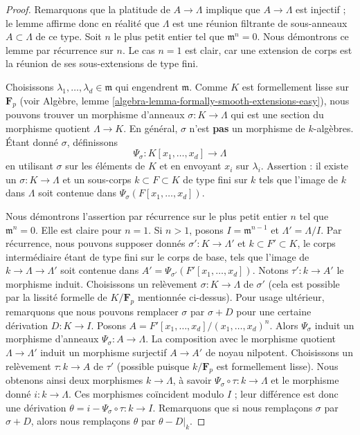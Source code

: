 \begin{proof}
Remarquons que la platitude de $A \to \Lambda$ implique que $A \to \Lambda$
est injectif ; le lemme affirme donc en réalité que $\Lambda$ est une
réunion filtrante de sous-anneaux $A \subset \Lambda$ de ce type.
Soit $n$ le plus petit entier tel que $\mathfrak m^n = 0$.
Nous démontrons ce lemme par récurrence sur $n$. Le cas $n = 1$ est clair,
car une extension de corps est la réunion de ses sous-extensions de type fini.

\medskip\noindent
Choisissons $\lambda_1, \ldots, \lambda_d \in \mathfrak m$ qui engendrent
$\mathfrak m$. Comme $K$ est formellement lisse sur $\mathbf{F}_p$ (voir
Algèbre, lemme \ref{algebra-lemma-formally-smooth-extensions-easy}), nous pouvons
trouver un morphisme d'anneaux $\sigma : K \to \Lambda$ qui est une section du
morphisme quotient $\Lambda \to K$. En général, $\sigma$ n'est {\bf pas}
un morphisme de $k$-algèbres. Étant donné $\sigma$, définissons
$$
\Psi_\sigma : K[x_1, \ldots, x_d] \longrightarrow \Lambda
$$
en utilisant $\sigma$ sur les éléments de $K$ et en envoyant $x_i$ sur $\lambda_i$.
Assertion : il existe un $\sigma : K \to \Lambda$
et un sous-corps $k \subset F \subset K$ de type fini sur $k$
tels que l'image de $k$ dans $\Lambda$ soit contenue dans
$\Psi_\sigma(F[x_1, \ldots, x_d])$.

\medskip\noindent
Nous démontrons l'assertion par récurrence sur le plus petit entier $n$ tel que
$\mathfrak m^n = 0$. Elle est claire pour $n = 1$. Si $n > 1$, posons
$I = \mathfrak m^{n - 1}$ et $\Lambda' = \Lambda/I$.
Par récurrence, nous pouvons supposer donnés
$\sigma' : K \to \Lambda'$ et $k \subset F' \subset K$, le corps intermédiaire
étant de type fini sur le corps de base, tels que l'image de $k \to \Lambda \to \Lambda'$
soit contenue dans $A' = \Psi_{\sigma'}(F'[x_1, \ldots, x_d])$.
Notons $\tau' : k \to A'$ le morphisme induit.
Choisissons un relèvement $\sigma : K \to \Lambda$ de $\sigma'$ (cela est possible
par la lissité formelle de $K/\mathbf{F}_p$ mentionnée ci-dessus).
Pour usage ultérieur, remarquons que nous pouvons remplacer $\sigma$ par
$\sigma + D$ pour une certaine dérivation $D : K \to I$.
Posons $A = F'[x_1, \ldots, x_d]/(x_1, \ldots, x_d)^n$.
Alors $\Psi_\sigma$ induit un morphisme d'anneaux
$\Psi_\sigma : A \to \Lambda$. La composition avec le
morphisme quotient $\Lambda \to \Lambda'$ induit un morphisme surjectif
$A \to A'$ de noyau nilpotent.
Choisissons un relèvement $\tau : k \to A$ de $\tau'$ (possible puisque $k/\mathbf{F}_p$
est formellement lisse). Nous obtenons ainsi deux morphismes $k \to \Lambda$, à savoir
$\Psi_\sigma \circ \tau : k \to \Lambda$ et le morphisme donné $i : k \to \Lambda$.
Ces morphismes coïncident modulo $I$ ; leur différence est donc une
dérivation $\theta = i - \Psi_\sigma \circ \tau : k \to I$.
Remarquons que si nous remplaçons $\sigma$ par $\sigma + D$, alors nous remplaçons
$\theta$ par $\theta - D|_k$.


\end{proof}
